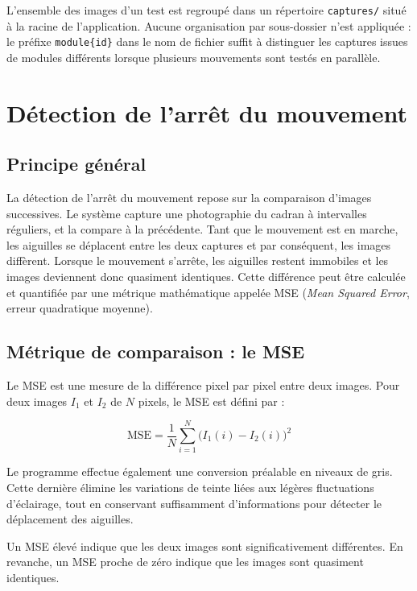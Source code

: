 L'ensemble des images d'un test est regroupé dans un répertoire
\texttt{captures/} situé à la racine de l'application. Aucune
organisation par sous-dossier n'est appliquée : le préfixe
\texttt{module\{id\}} dans le nom de fichier suffit à distinguer les
captures issues de modules différents lorsque plusieurs mouvements
sont testés en parallèle.

\section{Détection de l'arrêt du mouvement}
\label{sec:detection}

\subsection{Principe général}

La détection de l'arrêt du mouvement repose sur la comparaison d'images successives.
Le système capture une photographie du cadran à intervalles réguliers, et la compare à la précédente.
Tant que le mouvement est en marche, les aiguilles se déplacent entre les deux captures et par conséquent, les images diffèrent.
Lorsque le mouvement s'arrête, les aiguilles restent immobiles et les images deviennent donc quasiment identiques.
Cette différence peut être calculée et quantifiée par une métrique mathématique appelée MSE (\textit{Mean Squared Error}, erreur quadratique moyenne).

\subsection{Métrique de comparaison : le MSE}

Le MSE est une mesure de la différence pixel par pixel entre deux images.
Pour deux images $I_1$ et $I_2$ de $N$ pixels, le MSE est défini par :

\begin{equation}
    \text{MSE} = \frac{1}{N} \sum_{i=1}^{N} \bigl(I_1(i) - I_2(i)\bigr)^2
    \label{eq:mse}
\end{equation}

Le programme effectue également une conversion préalable en niveaux de gris.
Cette dernière élimine les variations de teinte liées aux légères fluctuations d'éclairage, tout
en conservant suffisamment d'informations pour détecter le déplacement
des aiguilles.

Un MSE élevé indique que les deux images sont significativement différentes.
En revanche, un MSE proche de zéro indique que les images sont quasiment identiques.

